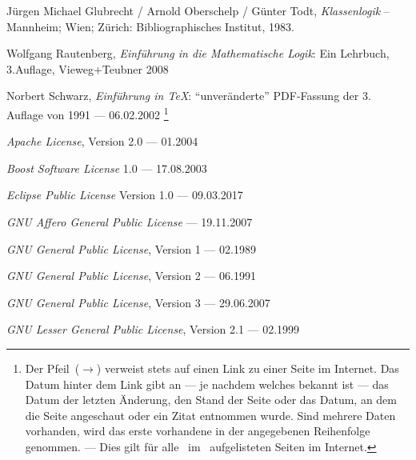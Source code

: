 \begin{flushleft}
	\begin{thebibliography}{12}
		\label{dic:Literaturverzeichnis}
		\likesection{\bibname}

		 Jürgen Michael Glubrecht / Arnold Oberschelp / Günter Todt,
		\emph{Klassenlogik}
		-- Mannheim; Wien; Zürich: Bibliographisches Institut, 1983.

		 Wolfgang Rautenberg,
		\emph{Einführung in die Mathematische Logik}:
		Ein Lehrbuch, 3.\@ Auflage, Vieweg+Teubner 2008

		 Norbert Schwarz,
		\emph{Einführung in \TeX}:
		"`unveränderte"' PDF-Fassung der 3. Auflage von 1991
		--- 06.02.2002
		\footnote{%
			Der Pfeil~($\rightarrow$) verweist stets auf einen Link zu einer Seite im Internet.
			Das Datum hinter dem Link gibt an --- je nachdem welches bekannt ist --- das Datum der letzten Änderung, den Stand der Seite oder das Datum, an dem die Seite angeschaut oder ein Zitat entnommen wurde.
			Sind mehrere Daten vorhanden, wird das erste vorhandene in der angegebenen Reihenfolge genommen.
			--- Dies gilt für alle \hier\ im \bibname\ aufgelisteten Seiten im Internet.
		}

		 \emph{Apache License}, Version 2.0
		--- 01.2004

		 \emph{Boost Software License} 1.0
		--- 17.08.2003

		 \emph{Eclipse Public License} Version 1.0
		--- 09.03.2017

		 \emph{GNU Affero General Public License}
		--- 19.11.2007

		 \emph{GNU General Public License}, Version 1
		--- 02.1989

		 \emph{GNU General Public License}, Version 2
		--- 06.1991

		 \emph{GNU General Public License}, Version 3
		--- 29.06.2007

		 \emph{GNU Lesser General Public License}, Version 2.1
		--- 02.1999


\end{thebibliography}
\end{flushleft}

